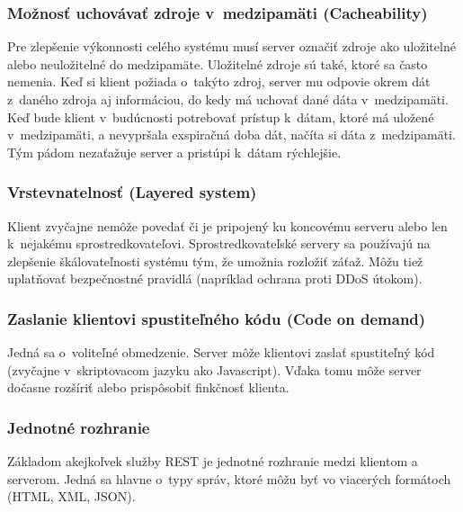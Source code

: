 \documentclass[slovak]{fitthesis}
\begin{document}
\subsubsection{Možnosť uchovávať zdroje v~medzipamäti (Cacheability)}
Pre zlepšenie výkonnosti celého systému musí server označiť zdroje ako uložitelné alebo neuložitelné do medzipamäte. Uložitelné zdroje sú také, ktoré sa často nemenia. Keď si klient požiada o~takýto zdroj, server mu odpovie okrem dát z~daného zdroja aj informáciou, do kedy má uchovať dané dáta v~medzipamäti. Keď bude klient v~budúcnosti potrebovať prístup k~dátam, ktoré má uložené v~medzipamäti, a nevypršala exspiračná doba dát, načíta si dáta z~medzipamäti. Tým pádom nezaťažuje server a pristúpi k~dátam rýchlejšie. 

\subsubsection{Vrstevnatelnosť (Layered system)}
Klient zvyčajne nemôže povedať či je pripojený ku koncovému serveru alebo len k~nejakému sprostredkovateľovi. Sprostredkovateľské servery sa používajú na zlepšenie škálovateľnosti systému tým, že umožnia rozložiť záťaž. Môžu tiež uplatňovať bezpečnostné pravidlá (napríklad ochrana proti DDoS útokom).

\subsubsection{Zaslanie klientovi spustiteľného kódu (Code on demand)}
Jedná sa o~voliteľné obmedzenie. Server môže klientovi zaslať spustiteľný kód (zvyčajne v~skriptovacom jazyku ako Javascript). Vďaka tomu môže server dočasne rozšíriť alebo prispôsobiť finkčnosť klienta.

\subsubsection{Jednotné rozhranie}
Základom akejkoľvek služby REST je jednotné rozhranie medzi klientom a serverom. Jedná sa hlavne o~typy správ, ktoré môžu byť vo viacerých formátoch (HTML, XML, JSON).
\end{document}
